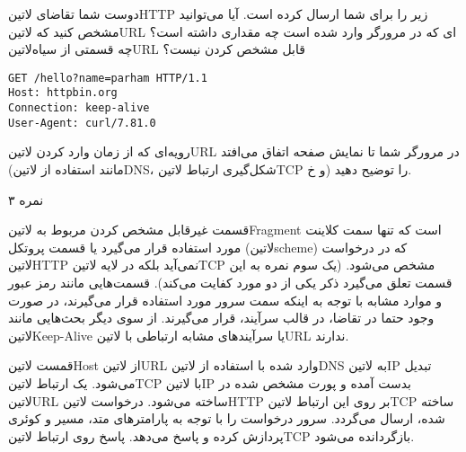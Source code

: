 
دوست شما تقاضای ‌لاتین{HTTP} زیر را برای شما ارسال کرده است.
آیا می‌توانید مشخص کنید که ‌لاتین{URL} ای که در مرورگر وارد شده است چه مقداری داشته است؟
چه قسمتی از ‌سیاه{‌لاتین{URL}} قابل مشخص کردن نیست؟

\begin{latin}
\begin{verbatim}
GET /hello?name=parham HTTP/1.1
Host: httpbin.org
Connection: keep-alive
User-Agent: curl/7.81.0
\end{verbatim}
\end{latin}

رویه‌ای که از زمان وارد کردن ‌لاتین{URL} در مرورگر شما تا نمایش صفحه اتفاق می‌افتد (مانند استفاده از ‌لاتین{DNS}، شکل‌گیری ارتباط ‌لاتین{TCP} و ‌خ) را توضیح دهید.

۳ نمره


قسمت غیرقابل مشخص کردن مربوط به ‌لاتین{Fragment} است که تنها سمت کلاینت مورد استفاده قرار می‌گیرد
یا قسمت پروتکل (‌لاتین{scheme}) که در درخواست ‌لاتین{HTTP} نمی‌آید بلکه در لایه ‌لاتین{TCP} مشخص می‌شود.
(یک سوم نمره به این قسمت تعلق می‌گیرد ذکر یکی از دو مورد کفایت می‌کند).
قسمت‌هایی مانند رمز عبور و موارد مشابه با توجه به اینکه سمت سرور مورد استفاده قرار می‌گیرند، در صورت وجود حتما در تقاضا،
در قالب سرآیند، قرار می‌گیرند.
از سوی دیگر بحث‌هایی مانند ‌لاتین{Keep-Alive} یا سرآیندهای مشابه ارتباطی با ‌لاتین{URL} ندارند.

 قمست ‌لاتین{Host} از ‌لاتین{URL} وارد شده با استفاده از ‌لاتین{DNS} به ‌لاتین{IP} تبدیل می‌شود.
 یک ارتباط ‌لاتین{TCP} با ‌لاتین{IP} بدست آمده و پورت مشخص شده در ‌لاتین{URL} ساخته می‌شود.
 درخواست ‌لاتین{HTTP} بر روی این ارتباط ‌لاتین{TCP} ساخته شده، ارسال می‌گردد.
 سرور درخواست را با توجه به پارامترهای متد، مسیر و کوئری پردازش کرده و پاسخ می‌دهد.
 پاسخ روی ارتباط ‌لاتین{TCP} بازگردانده می‌شود.

